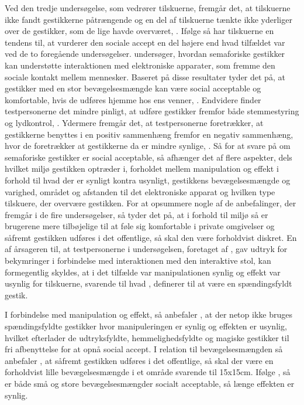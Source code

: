 Ved den tredje undersøgelse, som vedrører tilskuerne, fremgår det, at tilskuerne ikke fandt gestikkerne påtrængende og en del af tilskuerne tænkte ikke yderliger over de gestikker, som de lige havde overværet, \parencite[s. 200]{PDF:AreYouComfortableDoingThat}. Ifølge \textcite[s. 200]{PDF:AreYouComfortableDoingThat} så har tilskuerne en tendens til, at vurderer den sociale accept en del højere end hvad tilfældet var ved de to foregående undersøgelser. \blankline
%
\textcite{PDF:AnExploratoryStudy} undersøger, hvordan semaforiske gestikker kan understøtte interaktionen med elektroniske apparater, som fremme den sociale kontakt mellem mennesker. Baseret på disse resultater tyder det på, at gestikker med en stor bevægelsesmængde kan være social acceptable og komfortable, hvis de udføres hjemme hos ens venner, \parencite[s. 4]{PDF:AnExploratoryStudy}. Endvidere finder testpersonerne det mindre pinligt, at udføre gestikker fremfor både stemmestyring og lydkontrol, \parencite[s. 4]{PDF:AnExploratoryStudy}. Ydermere fremgår det, at testpersonerne foretrækker, at gestikkerne benyttes i en positiv sammenhæng fremfor en negativ sammenhæng, hvor de foretrækker at gestikkerne da er mindre synlige, \parencite[s. 4]{PDF:AnExploratoryStudy}. \blankline
%
Så for at svare på om semaforiske gestikker er social acceptable, så afhænger det af flere aspekter, dels hvilket miljø gestikken optræder i, forholdet mellem manipulation og effekt i forhold til hvad der er synligt kontra usynligt, gestikkens bevægelsesmængde og varighed, området og afstanden til det elektroniske apparat og hvilken type tilskuere, der overvære gestikken. For at opsummere nogle af de anbefalinger, der fremgår i de fire undersøgelser, så tyder det på, at i forhold til miljø så er brugerene mere tilbøjelige til at føle sig komfortable i private omgivelser og såfremt gestikken udføres i det offentlige, så skal den være forholdvist diskret. En af årsageren til, at testpersonerne i undersøgelsen, foretaget af \textcite[s. 4]{PDF:AChairAsUbiquitousInputDevice}, gav udtryk for bekymringer i forbindelse med interaktionen med den interaktive stol, kan formegentlig skyldes, at i det tilfælde var manipulationen synlig og effekt var usynlig for tilskuerne, svarende til hvad \textcite[s. 276]{PDF:WouldYouDoThat}, definerer til at være en spændingsfyldt gestik.  

I forbindelse med manipulation og effekt, så anbefaler \textcite[s. 278]{PDF:WouldYouDoThat}, at der netop ikke bruges spændingsfyldte gestikker hvor manipuleringen er synlig og effekten er usynlig, hvilket efterlader de udtryksfyldte, hemmelighedsfyldte og magiske gestikker til fri afbenyttelse for at opnå social accept. I relation til bevægelsesmængden så anbefaler \textcite[s. 201]{PDF:AreYouComfortableDoingThat}, at såfremt gestikken udføres i det offentlige, så skal der være en forholdvist lille bevægelsesmængde i et område svarende til 15x15cm. Ifølge \textcite[s. 278]{PDF:WouldYouDoThat}, så er både små og store bevægelsesmængder socialt acceptable, så længe effekten er synlig.

